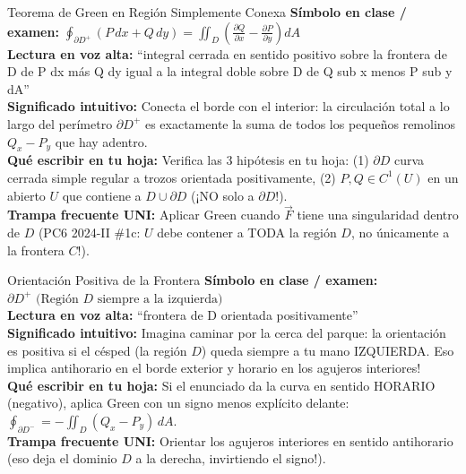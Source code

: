 \documentclass[11pt,a4paper]{article}
\begin{document}
\begin{definicionbox}{Teorema de Green en Región Simplemente Conexa}
\textbf{Símbolo en clase / examen:} $\oint_{\partial D^+} (P\,dx + Q\,dy) = \iint_D \left(\frac{\partial Q}{\partial x} - \frac{\partial P}{\partial y}\right) dA$\\[0.15cm]
\textbf{Lectura en voz alta:} ``integral cerrada en sentido positivo sobre la frontera de D de P dx más Q dy igual a la integral doble sobre D de Q sub x menos P sub y dA''\\[0.12cm]
\textbf{Significado intuitivo:} Conecta el borde con el interior: la circulación total a lo largo del perímetro $\partial D^+$ es exactamente la suma de todos los pequeños remolinos $Q_x - P_y$ que hay adentro.\\[0.12cm]
\textbf{Qué escribir en tu hoja:} Verifica las 3 hipótesis en tu hoja: (1) $\partial D$ curva cerrada simple regular a trozos orientada positivamente, (2) $P, Q \in C^1(U)$ en un abierto $U$ que contiene a $D \cup \partial D$ (¡NO solo a $\partial D$!).\\[0.12cm]
\textbf{Trampa frecuente UNI:} Aplicar Green cuando $\vec{F}$ tiene una singularidad dentro de $D$ (PC6 2024-II \#1c: $U$ debe contener a TODA la región $D$, no únicamente a la frontera $C$!).
\end{definicionbox}

\begin{definicionbox}{Orientación Positiva de la Frontera}
\textbf{Símbolo en clase / examen:} $\partial D^+ \text{ (Región } D \text{ siempre a la izquierda)}$\\[0.15cm]
\textbf{Lectura en voz alta:} ``frontera de D orientada positivamente''\\[0.12cm]
\textbf{Significado intuitivo:} Imagina caminar por la cerca del parque: la orientación es positiva si el césped (la región $D$) queda siempre a tu mano IZQUIERDA. Eso implica antihorario en el borde exterior y horario en los agujeros interiores!\\[0.12cm]
\textbf{Qué escribir en tu hoja:} Si el enunciado da la curva en sentido HORARIO (negativo), aplica Green con un signo menos explícito delante: $\oint_{\partial D^-} = -\iint_D (Q_x - P_y)\,dA$.\\[0.12cm]
\textbf{Trampa frecuente UNI:} Orientar los agujeros interiores en sentido antihorario (eso deja el dominio $D$ a la derecha, invirtiendo el signo!).
\end{definicionbox}
\end{document}

